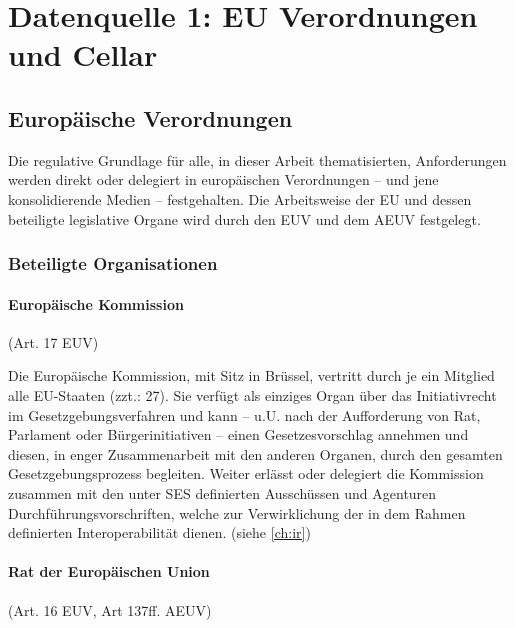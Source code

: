 \chapter{Datenquelle 1: EU Verordnungen und Cellar}
\section{Europäische Verordnungen}

    Die regulative Grundlage für alle, in dieser Arbeit thematisierten, Anforderungen werden direkt oder delegiert in europäischen Verordnungen -- und jene konsolidierende Medien -- festgehalten.
    Die Arbeitsweise der EU und dessen beteiligte legislative Organe wird durch den \acf{EUV} und dem \acf{AEUV} festgelegt.
        
\subsection{Beteiligte Organisationen}
\subsubsection{Europäische Kommission}

    \begin{center}
        {\footnotesize(Art. 17 \ac{EUV})}
    \end{center}
    
    \noindent
    Die Europäische Kommission, mit Sitz in Brüssel, vertritt durch je ein Mitglied alle EU-Staaten (zzt.: 27). 
    Sie verfügt als einziges Organ über das Initiativrecht im Gesetzgebungsverfahren und kann – u.U. nach der Aufforderung von Rat, Parlament oder Bürgerinitiativen – einen Gesetzesvorschlag annehmen und diesen, in enger Zusammenarbeit mit den anderen Organen, durch den gesamten Gesetzgebungsprozess begleiten.
    \cite[Art. 17]{EUV}
    Weiter erlässt oder delegiert die Kommission zusammen mit den unter \ac{SES} definierten Ausschüssen und Agenturen Durchführungsvorschriften, welche zur Verwirklichung der in dem Rahmen definierten Interoperabilität dienen. (siehe \ref{ch:ir})
    
\subsubsection{Rat der Europäischen Union}

    \begin{center}
        {\footnotesize(Art. 16 \ac{EUV}, Art 137ff. \ac{AEUV})}
    \end{center}
    
